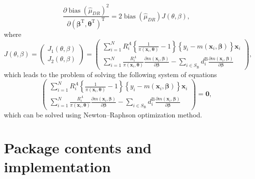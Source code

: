 \documentclass[
]{jss}
\begin{document}
\begin{equation*}
\frac{\partial \operatorname{bias}\left(\hat{\mu}_{D R}\right)^2}{\partial\left(\boldsymbol{\beta}^{\mathrm{T}}, \boldsymbol{\theta}^{\mathrm{T}}\right)^{\mathrm{T}}}=2 \operatorname{bias}\left(\hat{\mu}_{D R}\right) J(\theta, \beta),
\end{equation*} where \begin{equation*}
J(\theta, \beta)=\left(\begin{array}{l}
J_1(\theta, \beta) \\
J_2(\theta, \beta)
\end{array}\right)=\left(\begin{array}{c}
\sum_{i=1}^N R_i^A\left\{\frac{1}{\pi\left(\boldsymbol{x}_i, \boldsymbol{\theta}\right)}-1\right\}\left\{y_i-m\left(\boldsymbol{x}_i, \boldsymbol{\beta}\right)\right\} \boldsymbol{x}_i \\
\sum_{i=1}^N \frac{R_i^A}{\pi\left(\boldsymbol{x}_i, \boldsymbol{\theta}\right)} \frac{\partial m\left(\boldsymbol{x}_i, \boldsymbol{\beta}\right)}{\partial \boldsymbol{\beta}}-\sum_{i \in S_{\mathrm{B}}} d_i^{\mathrm{B}} \frac{\partial m\left(\boldsymbol{x}_i, \boldsymbol{\beta}\right)}{\partial \boldsymbol{\beta}}
\end{array}\right),
\end{equation*} which leads to the problem of solving the following
system of equations \begin{equation}
\label{bias-min}
    \left(\begin{array}{c}
\sum_{i=1}^N R_i^A\left\{\frac{1}{\pi\left(\boldsymbol{x}_i, \boldsymbol{\theta}\right)}-1\right\}\left\{y_i-m\left(\boldsymbol{x}_i, \boldsymbol{\beta}\right)\right\} \boldsymbol{x}_i \\
\sum_{i=1}^N \frac{R_i^A}{\pi\left(\boldsymbol{x}_i, \boldsymbol{\theta}\right)} \frac{\partial m\left(\boldsymbol{x}_i, \boldsymbol{\beta}\right)}{\partial \boldsymbol{\beta}}-\sum_{i \in S_{\mathrm{B}}} d_i^{\mathrm{B}} \frac{\partial m\left(\boldsymbol{x}_i, \boldsymbol{\beta}\right)}{\partial \boldsymbol{\beta}}
\end{array}\right) = \boldsymbol{0},
\end{equation} which can be solved using Newton--Raphson optimization
method.

\hypertarget{package-contents-and-implementation}{%
\section{Package contents and
implementation}\label{package-contents-and-implementation}}
\end{document}

